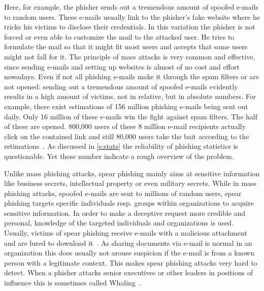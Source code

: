 \begin{description}[leftmargin=0cm]
	\item[Mass Phishing] Here, for example, the phisher sends out a tremendous amount of spoofed e-mails to random users.
 These e-mails usually link to the phisher's fake website where he tricks his victims to disclose their credentials.
 In this variation the phisher is not forced or even able to customize the mail to the attacked user.
 He tries to formulate the mail so that it might fit most users and accepts that some users might not fall for it.
 The principle of mass attacks is very common and effective, since sending e-mails and setting up websites is almost of no cost and effort nowadays.
 Even if not all phishing e-mails make it through the spam filters or are not opened: sending out a tremendous amount of spoofed e-mails evidently results in a high amount of victims, not in relative, but in absolute numbers.
 For example, there exist estimations of 156 million phishing e-mails being sent out daily.
 Only 16 million of these e-mails win the fight against spam filters.
 The half of these are opened.
 800,000 users of these 8 million e-mail recipients actually click on the contained link and still 80,000 users take the bait according to the estimations~\cite{takethebait}. As discussed in \autoref{s:stats} the reliability of phishing statistics is questionable. Yet these number indicate a rough overview of the problem.
	\item[Spear Phishing] Unlike mass phishing attacks, spear phishing mainly aims at sensitive information like business secrets, intellectual property or even military secrets.
 While in mass phishing attacks, spoofed e-mails are sent to millions of random users, spear phishing targets specific individuals resp.
 groups within organizations to acquire sensitive information.
 In order to make a deceptive request more credible and personal, knowledge of the targeted individuals and organizations is used.
 Usually, victims of spear phishing receive e-mails with a malicious attachment and are lured to download it~\cite{trendlabs2012spear}.
 As sharing documents via e-mail is normal in an organization this does usually not arouse suspicion if the e-mail is from a known person with a legitimate context.
 This makes spear phishing attacks very hard to detect\cite{trendlabs2012spear,statephishinghong}.
When a phisher attacks senior executives or other leaders in positions of influence this is sometimes called Whaling~\cite{whaling}.

\end{description}

